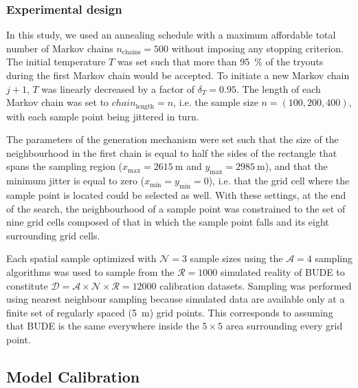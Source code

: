 \subsubsection{Experimental design}

In this study, we used an annealing schedule with a maximum affordable total number of Markov chains 
$n_\text{chains} = 500$ without imposing any stopping criterion. The initial temperature $T$ was set such that 
more than \SI{95}{\percent} of the tryouts during the first Markov chain would be accepted. To initiate a new 
Markov chain $j + 1$, $T$ was linearly decreased by a factor of $\delta_{T} = 0.95$. The length of each Markov 
chain was set to $chain_\text{length} = n$, i.e. the sample size $n = (100, 200, 400)$, with each sample point 
being jittered in turn.

The parameters of the generation mechanism were set such that the size of the neighbourhood in the first chain 
is equal to half the sides of the rectangle that spans the sampling region ($x_\text{max} = \SI{2615}{\m}$ and 
$y_\text{max} = \SI{2985}{\m}$), and that the minimum jitter is equal to zero ($x_\text{min} = y_\text{min} = 
0$), i.e. that the grid cell where the sample point is located could be selected as well. With these settings, 
at the end of the search, the neighbourhood of a sample point was constrained to the set of nine grid cells 
composed of that in which the sample point falls and its eight surrounding grid cells.

Each spatial sample optimized with $\mathcal{N} = 3$ sample sizes using the $\mathcal{A} = 4$ sampling 
algorithms was used to sample from the $\mathcal{R} = 1000$ simulated reality of BUDE to constitute 
$\mathcal{D} = \mathcal{A} \times \mathcal{N} \times \mathcal{R} = \num{12000}$ calibration datasets. Sampling 
was performed using nearest neighbour sampling because simulated data are available only at a finite set of 
regularly spaced (\SI{5}{\m}) grid points. This corresponds to assuming that BUDE is the same everywhere inside 
the $5 \times 5$ area surrounding every grid point.

\subsection{Model Calibration}

